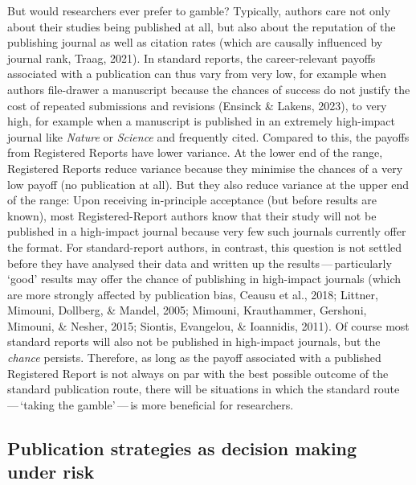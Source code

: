 \documentclass[
  british,
  a4paper,
  ,man,mask,floatsintext]{apa6}
\begin{document}
But would researchers ever prefer to gamble?
Typically, authors care not only about their studies being published at all, but also about the reputation of the publishing journal as well as citation rates (which are causally influenced by journal rank, Traag, 2021).
In standard reports, the career-relevant payoffs associated with a publication can thus vary from very low, for example when authors file-drawer a manuscript because the chances of success do not justify the cost of repeated submissions and revisions (Ensinck \& Lakens, 2023),
to very high, for example when a manuscript is published in an extremely high-impact journal like \emph{Nature} or \emph{Science} and frequently cited.
Compared to this, the payoffs from Registered Reports have lower variance.
At the lower end of the range, Registered Reports reduce variance because they minimise the chances of a very low payoff (no publication at all).
But they also reduce variance at the upper end of the range:
Upon receiving in-principle acceptance (but before results are known), most Registered-Report authors know that their study will not be published in a high-impact journal because very few such journals currently offer the format.
For standard-report authors, in contrast, this question is not settled before they have analysed their data and written up the results\(\,\)---\(\,\)particularly `good' results may offer the chance of publishing in high-impact journals (which are more strongly affected by publication bias, Ceausu et al., 2018; Littner, Mimouni, Dollberg, \& Mandel, 2005; Mimouni, Krauthammer, Gershoni, Mimouni, \& Nesher, 2015; Siontis, Evangelou, \& Ioannidis, 2011).
Of course most standard reports will also not be published in high-impact journals, but the \emph{chance} persists.
Therefore, as long as the payoff associated with a published Registered Report is not always on par with the best possible outcome of the standard publication route,
there will be situations in which the standard route\(\,\)---\(\,\)`taking the gamble'\(\,\)---\(\,\)is more beneficial for researchers.

\subsection{Publication strategies as decision making under risk}\label{publication-strategies-as-decision-making-under-risk}
\end{document}
